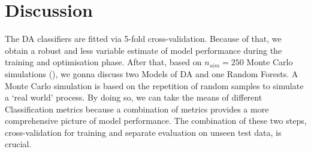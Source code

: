 \documentclass[12pt,a4paper,titlepage]{article}
\numberwithin{equation}{section}
\numberwithin{table}{section}
\numberwithin{figure}{section}
\begin{document}
\section{Discussion}\label{Discussion}
The DA classifiers are fitted via 5-fold cross-validation. Because of that, we obtain a robust and less variable estimate of model performance during the training and optimisation phase.
After that, based on $n_{sim} = 250$ Monte Carlo simulations (\cite{montecarlo}), we gonna discuss two Models of DA and one Random Forests. A Monte Carlo simulation is based on the repetition of random samples to simulate a ‘real world’ process. By doing so, we can take the means of different Classification metrics because a combination of metrics provides a more comprehensive picture of model performance. The combination of these two steps, cross-validation for training and separate evaluation on unseen test data, is crucial.
\end{document}
